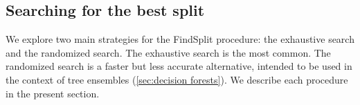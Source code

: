 %

%


\subsection{Searching for the best split}
\label{sec:split search}

We explore two main strategies for the FindSplit procedure: the exhaustive search and the randomized search. The exhaustive search is the most common. The randomized search is a faster but less accurate alternative, intended to be used in the context of tree ensembles (\autoref{sec:decision forests}). We describe each procedure in the present section.

